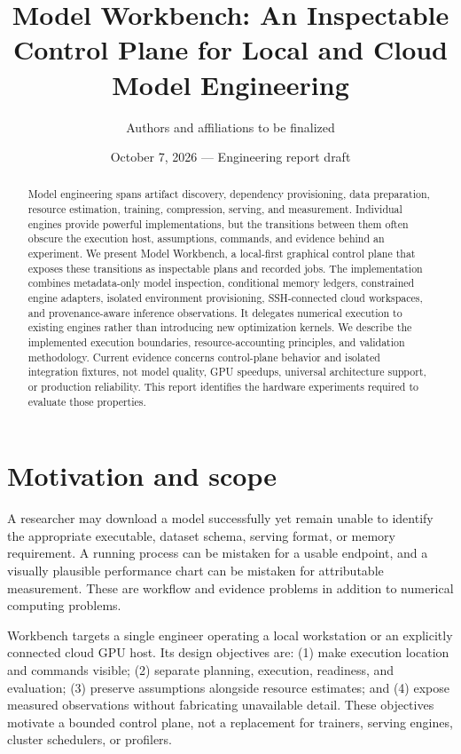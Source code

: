 \documentclass[10pt]{article}
\title{Model Workbench: An Inspectable Control Plane for Local and Cloud Model Engineering}
\author{Authors and affiliations to be finalized}
\date{October 7, 2026 --- Engineering report draft}
\begin{document}
\maketitle
\begin{abstract}
Model engineering spans artifact discovery, dependency provisioning, data preparation, resource estimation, training, compression, serving, and measurement. Individual engines provide powerful implementations, but the transitions between them often obscure the execution host, assumptions, commands, and evidence behind an experiment. We present Model Workbench, a local-first graphical control plane that exposes these transitions as inspectable plans and recorded jobs. The implementation combines metadata-only model inspection, conditional memory ledgers, constrained engine adapters, isolated environment provisioning, SSH-connected cloud workspaces, and provenance-aware inference observations. It delegates numerical execution to existing engines rather than introducing new optimization kernels. We describe the implemented execution boundaries, resource-accounting principles, and validation methodology. Current evidence concerns control-plane behavior and isolated integration fixtures, not model quality, GPU speedups, universal architecture support, or production reliability. This report identifies the hardware experiments required to evaluate those properties.
\end{abstract}

\section{Motivation and scope}
A researcher may download a model successfully yet remain unable to identify the appropriate executable, dataset schema, serving format, or memory requirement. A running process can be mistaken for a usable endpoint, and a visually plausible performance chart can be mistaken for attributable measurement. These are workflow and evidence problems in addition to numerical computing problems.

Workbench targets a single engineer operating a local workstation or an explicitly connected cloud GPU host. Its design objectives are: (1) make execution location and commands visible; (2) separate planning, execution, readiness, and evaluation; (3) preserve assumptions alongside resource estimates; and (4) expose measured observations without fabricating unavailable detail. These objectives motivate a bounded control plane, not a replacement for trainers, serving engines, cluster schedulers, or profilers.
\end{document}
